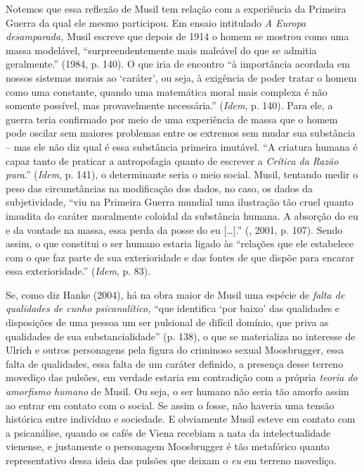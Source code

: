 Notemos que essa reflexão de Musil tem relação com a experiência
da Primeira Guerra da qual ele mesmo participou. Em ensaio intitulado
\emph{A Europa desamparada,} Musil escreve que depois de 1914 o homem se
mostrou como uma massa modelável, ``surpreendentemente mais maleável do
que se admitia geralmente.'' (1984, p. 140). O que iria de encontro ``à
importância acordada em nossos sistemas morais ao `caráter', ou seja, à
exigência de poder tratar o homem como uma constante, quando uma
matemática moral mais complexa é não somente possível, mas provavelmente
necessária.'' (\emph{Idem}, p. 140). Para ele, a guerra teria confirmado
por meio de uma experiência de massa que o homem pode oscilar sem
maiores problemas entre os extremos sem mudar sua substância -- mas ele
não diz qual é essa substância primeira imutável. ``A criatura humana é
capaz tanto de praticar a antropofagia quanto de escrever a
\emph{Crítica da Razão pura}.'' (\emph{Idem}, p. 141), o determinante
seria o meio social. Musil, tentando medir o peso das circunstâncias na
modificação dos dados, no caso, os dados da subjetividade, ``viu na
Primeira Guerra mundial uma ilustração tão cruel quanto inaudita do
caráter moralmente coloidal da substância humana. A absorção do eu e da
vontade na massa, essa perda da posse do eu [\ldots{}].'' (,
2001, p. 107). Sendo assim, o que constitui o ser humano estaria ligado
às ``relações que ele estabelece com o que faz parte de sua
exterioridade e das fontes de que dispõe para encarar essa
exterioridade.'' (\emph{Idem}, p. 83).

Se, como diz Hanke (2004), há na obra maior de Musil uma espécie de
\emph{falta de qualidades de cunho psicanalítico,} ``que identifica `por
baixo' das qualidades e disposições de uma pessoa um ser pulsional de
difícil domínio, que priva as qualidades de sua substancialidade'' (p.
138), o que se materializa no interesse de Ulrich e outros personagens
pela figura do criminoso sexual Moosbrugger, essa falta de qualidades,
essa falta de um caráter definido, a presença desse terreno movediço das
pulsões, em verdade estaria em contradição com a própria \emph{teoria do
amorfismo humano} de Musil. Ou seja, o ser humano não seria tão amorfo
assim ao entrar em contato com o social. Se assim o fosse, não haveria
uma tensão histórica entre indivíduo e sociedade. E obviamente Musil
esteve em contato com a psicanálise, quando os cafés de Viena recebiam a
nata da intelectualidade vienense, e justamente o personagem Moosbrugger
é tão metafórico quanto representativo dessa ideia das pulsões que
deixam o \emph{eu} em terreno movediço.

